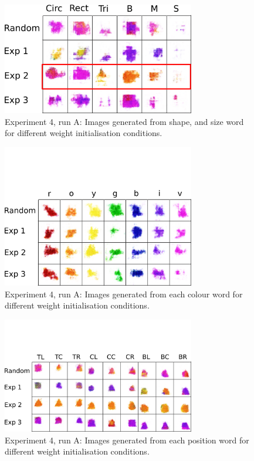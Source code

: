 \begin{figure}[h]
\centering
\includegraphics[width=0.75\textwidth]{Figs/shapes/singlelabel739_shape.png}
\caption{Experiment 4, run A: Images generated from shape, and size word for different weight initialisation conditions.}
\label{fig:739single_shape}
\end{figure}



\begin{figure}[h!]
\centering
\includegraphics[width=0.75\textwidth]{Figs/shapes/singlelabel739_col.png}
\caption{Experiment 4, run A: Images generated from each colour word for different weight initialisation conditions.}
\label{fig:739single_col}
\end{figure}

\begin{figure}[h]
\centering
\includegraphics[width=0.75\textwidth]{Figs/shapes/singlelabel739_pos.png}
\caption{Experiment 4, run A: Images generated from each position word for different weight initialisation conditions.}
\label{fig:739single_pos}
\end{figure}

